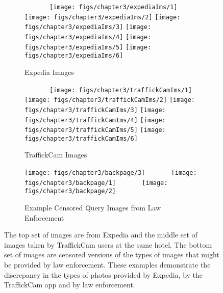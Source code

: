 \begin{figure*}[ht!]
  \begin{center}
  \begin{subfigure}[b]{\textwidth}
    \centering
    ~~~~~~~\texttt{[image: figs/chapter3/expediaIms/1]}
    \texttt{[image: figs/chapter3/expediaIms/2]}
    \texttt{[image: figs/chapter3/expediaIms/3]}
    \newline
    \texttt{[image: figs/chapter3/expediaIms/4]}
    \texttt{[image: figs/chapter3/expediaIms/5]}  
    \texttt{[image: figs/chapter3/expediaIms/6]} 
    \caption{Expedia Images}
  \end{subfigure}
  
  \begin{subfigure}[b]{\textwidth}
    \centering
    ~~~~~~~\texttt{[image: figs/chapter3/traffickCamIms/1]}
    \texttt{[image: figs/chapter3/traffickCamIms/2]}
    \texttt{[image: figs/chapter3/traffickCamIms/3]}
    \newline
    \texttt{[image: figs/chapter3/traffickCamIms/4]}
    \texttt{[image: figs/chapter3/traffickCamIms/5]}  
    \texttt{[image: figs/chapter3/traffickCamIms/6]}  
    \caption{TraffickCam Images}
  \end{subfigure}
  
  \begin{subfigure}[b]{\textwidth}
  \centering
    \texttt{[image: figs/chapter3/backpage/3]}
    ~~~~~~
    \texttt{[image: figs/chapter3/backpage/1]}
    ~~~~~~
    \texttt{[image: figs/chapter3/backpage/2]}
    \caption{Example Censored Query Images from Law Enforcement}
  \end{subfigure}
  
  \caption[Example images from TraffickCam and Expedia.]{The top set of images are from Expedia and the middle set of images taken by TraffickCam users at the same hotel. The bottom set of images are censored versions of the types of images that might be provided by law enforcement. These examples demonstrate the discrepancy in the types of photos provided by Expedia, by the TraffickCam app and by law enforcement.}
  \label{fig:example_ims}
  \end{center}
\end{figure*}


